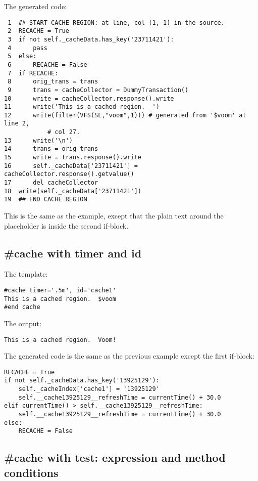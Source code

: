 The generated code:
\begin{verbatim}
 1  ## START CACHE REGION: at line, col (1, 1) in the source.
 2  RECACHE = True
 3  if not self._cacheData.has_key('23711421'):
 4      pass
 5  else:
 6      RECACHE = False
 7  if RECACHE:
 8      orig_trans = trans
 9      trans = cacheCollector = DummyTransaction()
10      write = cacheCollector.response().write
11      write('This is a cached region.  ')
12      write(filter(VFS(SL,"voom",1))) # generated from '$voom' at line 2, 
            # col 27.
13      write('\n')
14      trans = orig_trans
15      write = trans.response().write
16      self._cacheData['23711421'] = cacheCollector.response().getvalue()
17      del cacheCollector
18  write(self._cacheData['23711421'])
19  ## END CACHE REGION
\end{verbatim}

This is the same as the  example, except that the plain text
around the placeholder is inside the second if-block.  

\subsection{\#cache with timer and id}
\label{cache.directive.timer}

The template:
\begin{verbatim}
#cache timer='.5m', id='cache1'
This is a cached region.  $voom
#end cache
\end{verbatim}

The output:
\begin{verbatim}
This is a cached region.  Voom!
\end{verbatim}

The generated code is the same as the previous example except the first
if-block:
\begin{verbatim}
RECACHE = True
if not self._cacheData.has_key('13925129'):
    self._cacheIndex['cache1'] = '13925129'
    self.__cache13925129__refreshTime = currentTime() + 30.0
elif currentTime() > self.__cache13925129__refreshTime:
    self.__cache13925129__refreshTime = currentTime() + 30.0
else:
    RECACHE = False
\end{verbatim}

\subsection{\#cache with test: expression and method conditions}
\label{cache.directive.test}

